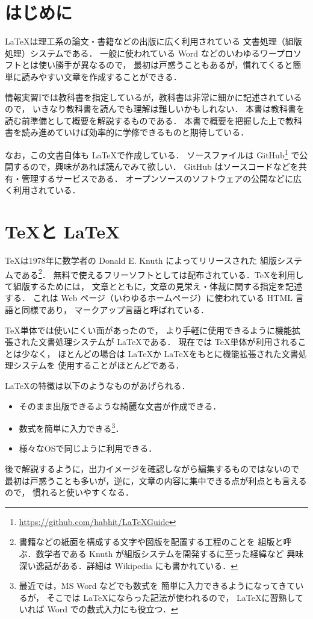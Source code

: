 \section{はじめに}


\LaTeX は理工系の論文・書籍などの出版に広く利用されている
文書処理（組版処理）システムである．
一般に使われている Word などのいわゆるワープロソフトとは使い勝手が異なるので，
最初は戸惑うこともあるが，慣れてくると簡単に読みやすい文章を作成することができる．

情報実習Iでは教科書\cite{TeXText}を指定しているが，教科書は非常に細かに記述されているので，
いきなり教科書を読んでも理解は難しいかもしれない．
本書は教科書を読む前準備として概要を解説するものである．
本書で概要を把握した上で教科書を読み進めていけば効率的に学修できるものと期待している．

なお，この文書自体も \LaTeX で作成している．
ソースファイルは GitHub\footnote{\url{https://github.com/habhit/LaTeXGuide}}
で公開するので，興味があれば読んでみて欲しい．
GitHub はソースコードなどを共有・管理するサービスである．
オープンソースのソフトウェアの公開などに広く利用されている．

\section{\TeX と \LaTeX}
\label{sec:TeXandLaTeX}

\TeX は1978年に数学者の Donald E. Knuth によってリリースされた
組版システムである\footnote{書籍などの紙面を構成する文字や図版を配置する工程のことを
組版と呼ぶ．数学者である Knuth が組版システムを開発するに至った経緯など
興味深い逸話がある．詳細は Wikipedia にも書かれている．}．
無料で使えるフリーソフトとしては配布されている．TeXを利用して組版するためには，
文章とともに，文章の見栄え・体裁に関する指定を記述する．
これは Web ページ（いわゆるホームページ）に使われている HTML 言語と同様であり，
マークアップ言語と呼ばれている．

\TeX 単体では使いにくい面があったので，
より手軽に使用できるように機能拡張された文書処理システムが \LaTeX である．
現在では \TeX 単体が利用されることは少なく，
ほとんどの場合は \LaTeX か \LaTeX をもとに機能拡張された文書処理システムを
使用することがほとんどである．

\LaTeX の特徴は以下のようなものがあげられる．
\begin{itemize}
\item そのまま出版できるような綺麗な文書が作成できる．
\item 数式を簡単に入力できる\footnote{最近では，MS Word などでも数式を
簡単に入力できるようになってきているが，
そこでは \LaTeX にならった記法が使われるので，
\LaTeX に習熟していれば Word での数式入力にも役立つ．}．
\item 様々なOSで同じように利用できる．
\end{itemize}
後で解説するように，出力イメージを確認しながら編集するものではないので
最初は戸惑うことも多いが，逆に，文章の内容に集中できる点が利点とも言えるので，
慣れると使いやすくなる．

